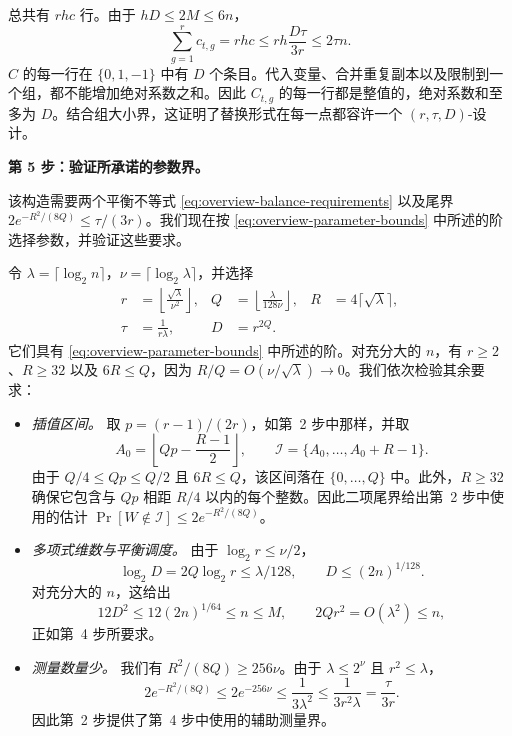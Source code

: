 \documentclass[11pt,reqno]{amsart}
\numberwithin{equation}{section}
\theoremstyle{definition}\newtheorem{definition}[theorem]{定义}
\theoremstyle{remark}\newtheorem{remark}[theorem]{注}
\renewcommand{\le}{\leqslant}
\renewcommand{\ge}{\geqslant}
\begin{document}
总共有 $rhc$ 行。由于 $hD\le2M\le6n$，
\[
 \sum_{g=1}^r c_{t,g}
 =rhc\le rh\frac{D\tau}{3r}\le2\tau n.
\]
$C$ 的每一行在 $\{0,1,-1\}$ 中有 $D$ 个条目。代入变量、合并重复副本以及限制到一个组，都不能增加绝对系数之和。因此 $C_{t,g}$ 的每一行都是整值的，绝对系数和至多为 $D$。结合组大小界，这证明了替换形式在每一点都容许一个 $(r,\tau,D)$-设计。

\medskip\noindent
\textbf{第 5 步：验证所承诺的参数界。}\par\nobreak
\smallskip\noindent
该构造需要两个平衡不等式 \eqref{eq:overview-balance-requirements} 以及尾界 $2e^{-R^2/(8Q)}\le\tau/(3r)$。我们现在按 \eqref{eq:overview-parameter-bounds} 中所述的阶选择参数，并验证这些要求。

令 $\lambda=\lceil\log_2 n\rceil$，$\nu=\lceil\log_2\lambda\rceil$，并选择
\begin{equation}\label{eq:overview-explicit-parameters}
 \begin{aligned}
 r&=\left\lfloor\frac{\sqrt\lambda}{\nu^2}\right\rfloor,
 &Q&=\left\lfloor\frac{\lambda}{128\nu}\right\rfloor,
 &R&=4\lceil\sqrt\lambda\rceil,\\
 \tau&=\frac1{r\lambda},
 &D&=r^{2Q}.
 \end{aligned}
\end{equation}
它们具有 \eqref{eq:overview-parameter-bounds} 中所述的阶。对充分大的 $n$，有 $r\ge2$、$R\ge32$ 以及 $6R\le Q$，因为 $R/Q=O(\nu/\sqrt\lambda)\to0$。我们依次检验其余要求：
\begin{itemize}
\item \emph{插值区间。}
取 $p=(r-1)/(2r)$，如第~2 步中那样，并取
\[
 A_0=\left\lfloor Qp-\frac{R-1}{2}\right\rfloor,\qquad
 \mathcal I=\{A_0,\ldots,A_0+R-1\}.
\]
由于 $Q/4\le Qp\le Q/2$ 且 $6R\le Q$，该区间落在 $\{0,\ldots,Q\}$ 中。此外，$R\ge32$ 确保它包含与 $Qp$ 相距 $R/4$ 以内的每个整数。因此二项尾界给出第~2 步中使用的估计 $\Pr[W\notin\mathcal I]\le2e^{-R^2/(8Q)}$。
\item \emph{多项式维数与平衡调度。}
由于 $\log_2 r\le\nu/2$，
\[
 \log_2 D=2Q\log_2 r\le\lambda/128,\qquad
 D\le(2n)^{1/128}.
\]
对充分大的 $n$，这给出
\[
 12D^2\le12(2n)^{1/64}\le n\le M,\qquad
 2Qr^2=O(\lambda^2)\le n,
\]
正如第~4 步所要求。
\item \emph{测量数量少。}
我们有 $R^2/(8Q)\ge256\nu$。由于 $\lambda\le2^\nu$ 且 $r^2\le\lambda$，
\[
 2e^{-R^2/(8Q)}\le2e^{-256\nu}
 \le\frac1{3\lambda^2}
 \le\frac1{3r^2\lambda}=\frac{\tau}{3r}.
\]
因此第~2 步提供了第~4 步中使用的辅助测量界。
\end{itemize}
\end{document}
